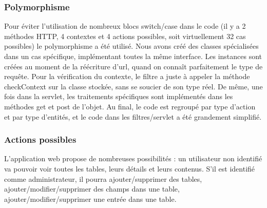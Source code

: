 \subsubsection{Polymorphisme}
Pour éviter l'utilisation de nombreux blocs switch/case dans le code (il y a 2 méthodes HTTP, 4 contextes et 4 actions possibles, soit virtuellement 32 cas possibles) le polymorphisme a été utilisé. Nous avons créé des classes spécialisées dans un cas spécifique, implémentant toutes la même interface. Les instances sont créées au moment de la réécriture d'url, quand on connaît parfaitement le type de requête. Pour la vérification du contexte, le filtre a juste à appeler la méthode checkContext sur la classe stockée, sans se soucier de son type réel. De même, une fois dans la servlet, les traitements spécifiques sont implémentés dans les méthodes get et post de l'objet. Au final, le code est regroupé par type d'action et par type d'entités, et le code dans les filtres/servlet a été grandement simplifié.

\subsubsection{Actions possibles}
L'application web propose de nombreuses possibilités : un utilisateur non identifié va pouvoir voir toutes les tables, leurs détails et leurs contenus.
S'il est identifié comme administrateur, il pourra ajouter/supprimer des tables, ajouter/modifier/supprimer des champs dans une table, ajouter/modifier/supprimer une entrée dans une table.
